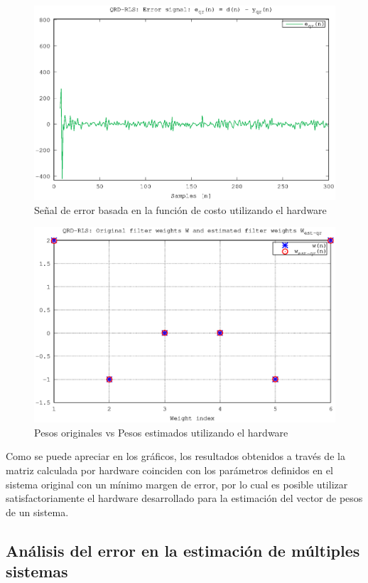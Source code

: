 \begin{figure}[htb!]
    \centering
        \includegraphics[width = 11 cm]{./figures/C05-hard_error}
        \caption{Señal de error basada en la función de costo utilizando el hardware}
        \label{fig:hard_error}
\end{figure}

\newpage

\begin{figure}[htb!]
    \centering
        \includegraphics[width = 11 cm]{./figures/C05-hard_estimated_weights}
        \caption{Pesos originales vs Pesos estimados utilizando el hardware}
        \label{fig:hard_estimated_weights}
\end{figure}

Como se puede apreciar en los gráficos, los resultados obtenidos a través de la matriz calculada por hardware coinciden con los parámetros definidos en el sistema original con un mínimo margen de error, por lo cual es posible utilizar satisfactoriamente el hardware desarrollado para la estimación del vector de pesos de un sistema.

\subsection{Análisis del error en la estimación de múltiples sistemas}

